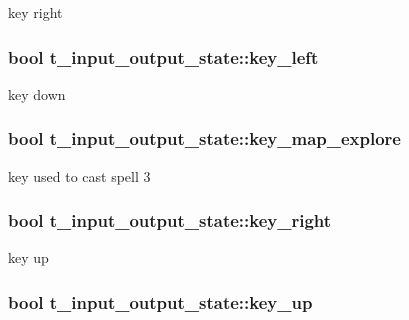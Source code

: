 key right \hypertarget{structt__input__output__state_a172f53bf31467a7570dee3edc04923ca}{
\subsubsection[{key\-\_\-left}]{\setlength{\rightskip}{0pt plus 5cm}bool t\-\_\-input\-\_\-output\-\_\-state\-::key\-\_\-left}}\label{structt__input__output__state_a172f53bf31467a7570dee3edc04923ca}
key down \hypertarget{structt__input__output__state_a05ce15a5c21b6d6381220699a897ff0d}{
\subsubsection[{key\-\_\-map\-\_\-explore}]{\setlength{\rightskip}{0pt plus 5cm}bool t\-\_\-input\-\_\-output\-\_\-state\-::key\-\_\-map\-\_\-explore}}\label{structt__input__output__state_a05ce15a5c21b6d6381220699a897ff0d}
key used to cast spell 3 \hypertarget{structt__input__output__state_af987d3e450c10a4e46b551f7aa1727d0}{
\subsubsection[{key\-\_\-right}]{\setlength{\rightskip}{0pt plus 5cm}bool t\-\_\-input\-\_\-output\-\_\-state\-::key\-\_\-right}}\label{structt__input__output__state_af987d3e450c10a4e46b551f7aa1727d0}
key up \hypertarget{structt__input__output__state_a3a7919d7cac4a16be272b9180e958c54}{
\subsubsection[{key\-\_\-up}]{\setlength{\rightskip}{0pt plus 5cm}bool t\-\_\-input\-\_\-output\-\_\-state\-::key\-\_\-up}}\label{structt__input__output__state_a3a7919d7cac4a16be272b9180e958c54}
